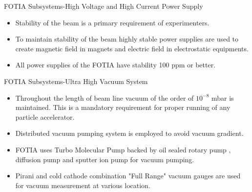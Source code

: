 \documentclass[11pt]{beamer}
\begin{document}
\begin{frame}{FOTIA Subsystems-High Voltage and High Current Power Supply}

  \begin{itemize}
      
    \item Stability of the beam is a primary requirement of experimenters.
    \item To maintain stability of the beam highly stable power supplies are used to create magnetic field in magnets and electric field in electrostatic equipments. 
    \item All power supplies of the FOTIA have stability 100 ppm or better.
           
   \end{itemize}

\end{frame}


\begin{frame}{FOTIA Subsystems-Ultra High Vacuum System}

  \begin{itemize}
      
    \item Throughout the length of beam line vacuum of the order of $10^{-8}$ mbar is maintained. This is a mandatory requirement for proper running of any particle accelerator.
    \item Distributed vacuum pumping system is employed to avoid vacuum gradient. 
    \item FOTIA uses Turbo Molecular Pump backed by oil sealed rotary pump , diffusion pump and sputter ion pump for vacuum pumping.
    \item Pirani and cold cathode combination "Full Range" vacuum gauges are used for vacuum measurement at various location.
           
   \end{itemize}

\end{frame}
\end{document}
